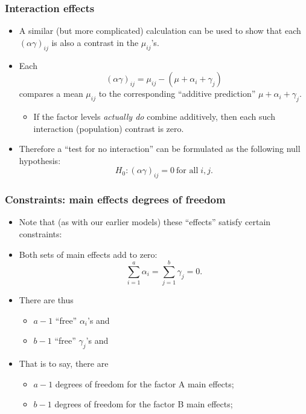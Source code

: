 \documentclass[a4paper]{article}
\begin{document}
\subsubsection{Interaction effects}
\begin{itemize}
	\item A similar (but more complicated) calculation can be used to show that each \( (\alpha \gamma)_{ij} \) is also a contrast in the \( \mu_{ij} \)'s.
	\item Each
	\[
		(\alpha\gamma)_{ij}=\mu_{ij}-(\mu+\alpha_i+\gamma_j)
	\]
	compares a mean \( \mu_{ij} \) to the corresponding ``additive prediction'' \( \mu + \alpha_i + \gamma_j \).
	\begin{itemize}
		\item If the factor levels \textit{actually do} combine additively, then each such interaction (population) contrast is zero.
	\end{itemize}
	\item Therefore a ``test for no interaction'' can be formulated as the following null hypothesis:
	\[
		H_0: (\alpha\gamma)_{ij}=0 \ \text{for all}\;i,j.
	\]
\end{itemize}
\subsubsection{Constraints: main effects degrees of freedom}
\begin{itemize}
	\item Note that (as with our earlier models) these ``effects'' satisfy certain constraints:
	\item Both sets of main effects add to zero:
	\[
		\sum_{i=1}^{a} \alpha_i = \sum_{j=1}^{b} \gamma_j = 0.
	\]
	\item There are thus
	\begin{itemize}
		\item \( a-1 \) ``free'' \( \alpha_i \)'s and
		\item \( b-1 \) ``free'' \( \gamma_j \)'s and
	\end{itemize}
	\item That is to say, there are
	\begin{itemize}
		\item \( a-1 \) degrees of freedom for the factor A main effects;
		\item \( b-1 \) degrees of freedom for the factor B main effects;
	\end{itemize}
\end{itemize}
\end{document}
